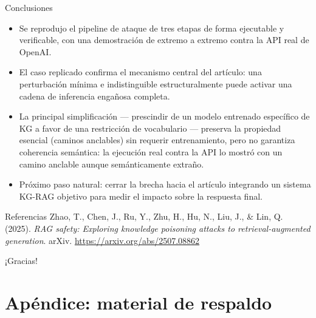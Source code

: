 \documentclass[aspectratio=169]{beamer}
\begin{document}
\begin{frame}{Conclusiones}
  \begin{itemize}
    \item Se reprodujo el pipeline de ataque de tres etapas de forma ejecutable
      y verificable, con una demostración de extremo a extremo contra la API
      real de OpenAI.
    \item El caso replicado confirma el mecanismo central del artículo: una
      perturbación mínima e indistinguible estructuralmente puede activar una
      cadena de inferencia engañosa completa.
    \item La principal simplificación --- prescindir de un modelo entrenado
      específico de KG a favor de una restricción de vocabulario --- preserva la
      propiedad esencial (caminos anclables) sin requerir entrenamiento, pero no
      garantiza coherencia semántica: la ejecución real contra la API lo mostró
      con un camino anclable aunque semánticamente extraño.
    \item Próximo paso natural: cerrar la brecha hacia el artículo integrando un
      sistema KG-RAG objetivo para medir el impacto sobre la respuesta final.
  \end{itemize}
\end{frame}

\begin{frame}{Referencias}
  \normalsize
  Zhao, T., Chen, J., Ru, Y., Zhu, H., Hu, N., Liu, J., \& Lin, Q. (2025).
  \emph{RAG safety: Exploring knowledge poisoning attacks to
  retrieval-augmented generation}. arXiv. \url{https://arxiv.org/abs/2507.08862}

  \vspace{3em}
  \begin{center}
    \Large ¡Gracias!
  \end{center}
\end{frame}

\appendix

\section{Apéndice: material de respaldo}
\end{document}
